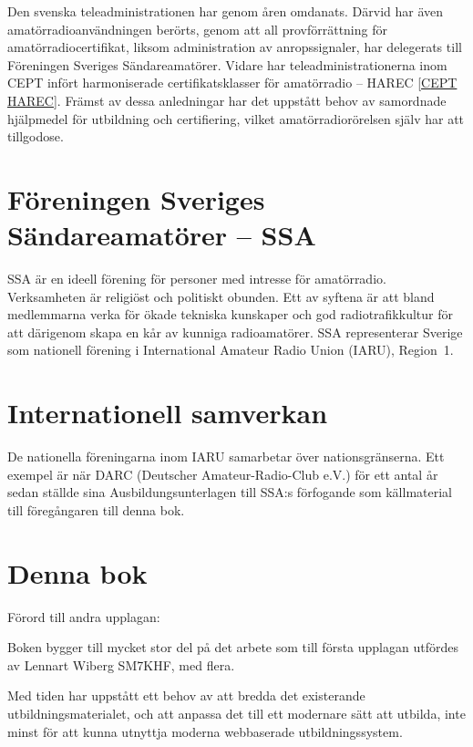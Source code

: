 Den svenska teleadministrationen har genom åren omdanats. Därvid har även
amatörradioanvändningen berörts, genom att all provförrättning för
amatörradiocertifikat, liksom administration av anropssignaler, har delegerats till Föreningen Sveriges Sändareamatörer. Vidare har teleadministrationerna inom CEPT infört
harmoniserade certifikatsklasser för amatörradio -- HAREC \ref{CEPT HAREC}. Främst av dessa anledningar har det uppstått behov av samordnade hjälpmedel för utbildning och certifiering, vilket amatörradiorörelsen själv har att tillgodose.

\section*{Föreningen Sveriges Sändareamatörer -- SSA}

SSA är en ideell förening för personer med intresse för amatörradio.
Verksamheten är religiöst och politiskt obunden. Ett av syftena är att bland
medlemmarna verka för ökade tekniska kunskaper och god radiotrafikkultur för att
därigenom skapa en kår av kunniga radioamatörer. SSA representerar Sverige som
nationell förening i International Amateur Radio Union (IARU), Region~1.

\section*{Internationell samverkan}

De nationella föreningarna inom IARU samarbetar över nationsgränserna. Ett
exempel är när DARC (Deutscher Amateur-Radio-Club e.V.) för ett antal år sedan
ställde sina Ausbildungsunterlagen till SSA:s förfogande som källmaterial till föregångaren till denna bok.

\section*{Denna bok}



\clearpage

Förord till andra upplagan:


Boken bygger till mycket stor del på det arbete som till första upplagan utfördes av Lennart Wiberg SM7KHF, med flera.

Med tiden har uppstått ett behov av att bredda det existerande utbildningsmaterialet, och att anpassa det till ett modernare sätt att utbilda, inte minst för att kunna utnyttja moderna webbaserade utbildningssystem.

